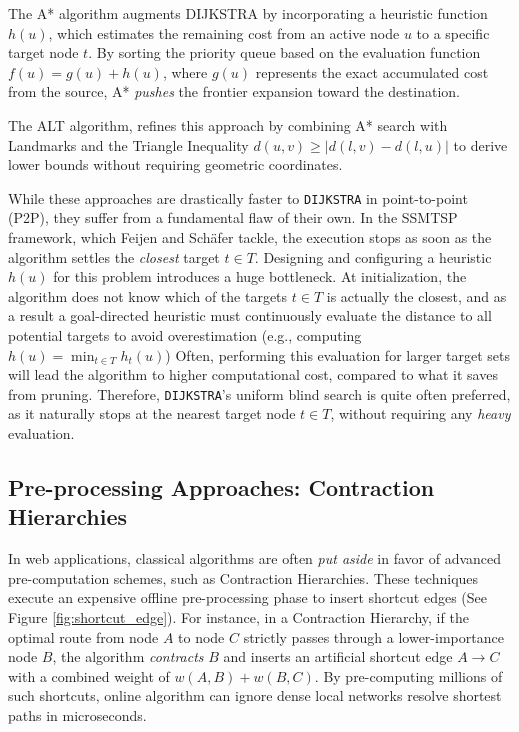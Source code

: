 The A* algorithm\cite{hartFormalBasisHeuristic1968b} augments \textsc{DIJKSTRA} by incorporating a heuristic function $h(u)$, which estimates the remaining cost from an active node $u$ to a specific target node $t$. By sorting the priority queue based on the evaluation function $f(u) = g(u) + h(u)$, where $g(u)$ represents the exact accumulated cost from the source, A* \textit{pushes} the frontier expansion toward the destination.

The ALT\cite{goldbergComputingShortestPath2005} algorithm, refines this approach by combining A* search with Landmarks and the Triangle Inequality  $d(u,v) \ge |d(l,v) - d(l,u)|$ to derive lower bounds without requiring geometric coordinates. 

While these approaches are drastically faster to \texttt{DIJKSTRA} in point-to-point (P2P), they suffer from a fundamental flaw of their own.  In the SSMTSP framework, which Feijen and Schäfer tackle, the execution stops as soon as the algorithm settles the \textit{closest} target $t \in T$. Designing and configuring a heuristic $h(u)$ for this problem introduces a huge bottleneck. At initialization, the algorithm does not know which of the targets $t \in T$ is actually the closest, and as a result a goal-directed heuristic must continuously evaluate the distance to all potential targets to avoid overestimation (e.g., computing $h(u) = \min_{t \in T} h_t(u)$)
Often, performing this evaluation for larger target sets will lead the algorithm to higher computational cost, compared to what it saves from pruning. Therefore, \texttt{DIJKSTRA}'s uniform blind search is quite often preferred, as it naturally stops at the nearest target node $t \in T$, without requiring any \textit{heavy} evaluation. 


\subsection{Pre-processing Approaches: Contraction Hierarchies}
\label{subsec:preprocessing_schemes}

In web applications, classical algorithms are often \textit{put aside} in favor of advanced pre-computation schemes, such as Contraction Hierarchies\cite{geisbergerContractionHierarchiesFaster2008}. These techniques execute an expensive offline pre-processing phase to insert shortcut edges (See Figure \ref{fig:shortcut_edge}). For instance, in a Contraction Hierarchy, if the optimal route from node $A$ to node $C$ strictly passes through a lower-importance node $B$, the algorithm \textit{contracts} $B$ and inserts an artificial shortcut edge $A \rightarrow C$ with a combined weight of $w(A,B) + w(B,C)$. By pre-computing millions of such shortcuts, online algorithm can ignore dense local networks resolve shortest paths in microseconds.

